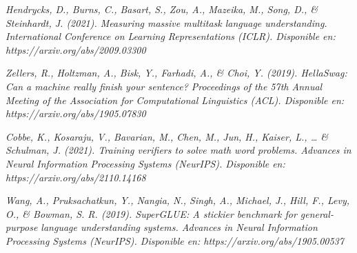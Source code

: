\begin{thebibliography}{9}
\textit{Hendrycks, D., Burns, C., Basart, S., Zou, A., Mazeika, M., Song, D., \& Steinhardt, J. (2021). Measuring massive multitask language understanding. International Conference on Learning Representations (ICLR). Disponible en: https://arxiv.org/abs/2009.03300}

\textit{Zellers, R., Holtzman, A., Bisk, Y., Farhadi, A., \& Choi, Y. (2019). HellaSwag: Can a machine really finish your sentence? Proceedings of the 57th Annual Meeting of the Association for Computational Linguistics (ACL). Disponible en: https://arxiv.org/abs/1905.07830}

\textit{Cobbe, K., Kosaraju, V., Bavarian, M., Chen, M., Jun, H., Kaiser, L., … \& Schulman, J. (2021). Training verifiers to solve math word problems. Advances in Neural Information Processing Systems (NeurIPS). Disponible en: https://arxiv.org/abs/2110.14168}

\textit{Wang, A., Pruksachatkun, Y., Nangia, N., Singh, A., Michael, J., Hill, F., Levy, O., \& Bowman, S. R. (2019). SuperGLUE: A stickier benchmark for general-purpose language understanding systems. Advances in Neural Information Processing Systems (NeurIPS). Disponible en: https://arxiv.org/abs/1905.00537}

\end{thebibliography}